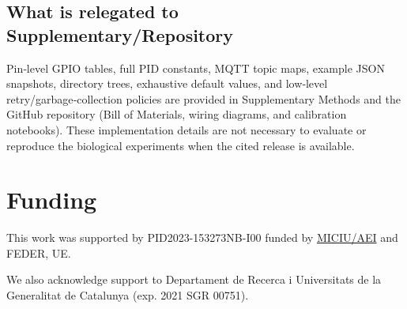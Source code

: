 \documentclass[aps,pre,twocolumn,floatfix,nofootinbib,amsmath,amssymb]{revtex4-2}
\begin{document}
\subsection{What is relegated to Supplementary/Repository}

Pin‑level GPIO tables, full PID constants, MQTT topic maps, example JSON snapshots, directory trees, exhaustive default values, and low‑level retry/garbage‑collection policies are provided in Supplementary Methods and the GitHub repository (Bill of Materials, wiring diagrams, and calibration notebooks). These implementation details are not necessary to evaluate or reproduce the biological experiments when the cited release is available.
\section{Funding}
This work was supported by PID2023-153273NB-I00 funded by \href{https://doi.org/10.13039/501100011033}{MICIU/AEI} and FEDER, UE.

 We also acknowledge support to Departament de Recerca i Universitats de la Generalitat de Catalunya (exp. 2021 SGR 00751).

\renewcommand{\bibsection}{\section{References}}

\end{document}
